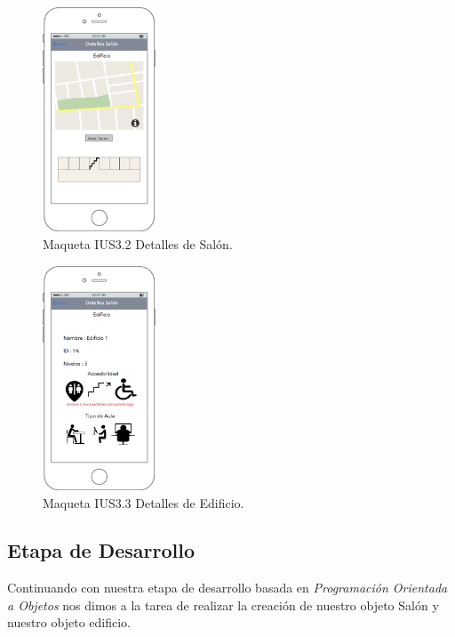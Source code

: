  \begin{figure}[h!]
	\begin{center}
		\includegraphics[width=0.3\textwidth]{images/maqueta/UIS32DetallesSalon.png}
		\caption{Maqueta IUS3.2 Detalles de Salón.}
		\label{fig:maquetasalon3}
	\end{center}
\end{figure}
 \begin{figure}[h!]
	\begin{center}
		\includegraphics[width=0.3\textwidth]{images/maqueta/UIS32DetallesEdificio.png}
		\caption{Maqueta IUS3.3 Detalles de Edificio.}
		\label{fig:maquetasalon4}
	\end{center}
\end{figure}

\subsection{Etapa de Desarrollo}
Continuando con nuestra etapa de desarrollo basada en \textit{Programación Orientada a Objetos} nos dimos a la tarea de realizar la creación de nuestro objeto Salón y nuestro objeto edificio.

